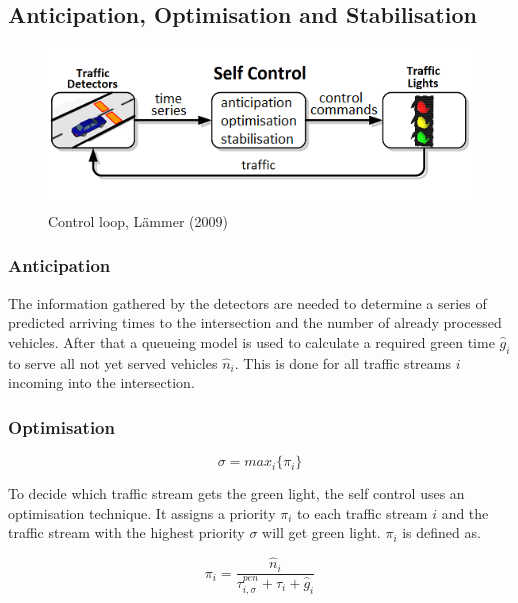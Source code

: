 \subsection{Anticipation, Optimisation and Stabilisation}

\begin{figure} [!htb]
	\centering
	\includegraphics[scale=0.62]{pic/self_control_translation.png}
	\caption{Control loop, L\"ammer (2009) \cite{laemmer09}}
	\label{img1}
\end{figure}

\subsubsection{Anticipation}
The information gathered by the detectors are needed to determine a series of predicted arriving times to the intersection and the number of already processed vehicles. After that a queueing model is used to calculate a required green time $\hat{g}_{i}$ to serve all not yet served vehicles $\hat{n}_{i}$. This is done for all traffic streams $i$ incoming into the intersection.

\subsubsection{Optimisation}

\[
\sigma = max_{i} \{\pi_{i}\} 
\]

To decide which traffic stream gets the green light, the self control uses an optimisation technique. It assigns a priority $\pi_{i}$ to each traffic stream $i$ and the traffic stream with the highest priority $\sigma$  will get green light. $\pi_{i}$ is defined as.

\[\pi_{i} = 
\frac{\hat{n}_{i}}
{\tau^{pen}_{i,\sigma}+\tau_i+\hat{g}_{i}} 
\]



